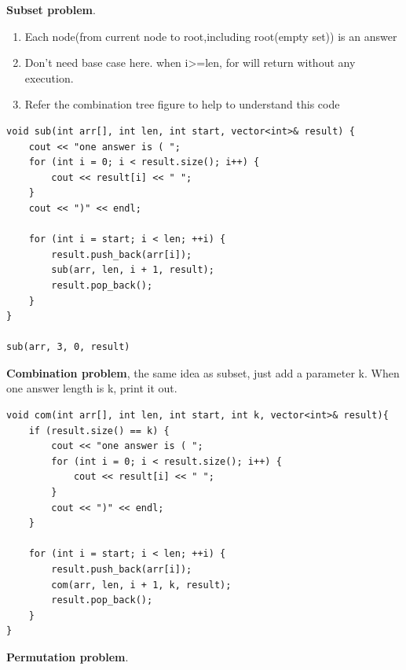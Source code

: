 \documentclass[a4paper,11pt,twoside]{book}
\begin{document}
	\par \textbf{Subset problem}. 
\begin{enumerate}
	\item Each node(from current node to root,including root(empty set)) is an answer
	\item Don't need base case here.  when i>=len, for will return without any execution.
	\item Refer the combination tree figure to help to understand this code
\end{enumerate}
	
\begin{lstlisting}
void sub(int arr[], int len, int start, vector<int>& result) {
	cout << "one answer is ( ";
	for (int i = 0; i < result.size(); i++) {
		cout << result[i] << " ";
	}
	cout << ")" << endl;
	
	for (int i = start; i < len; ++i) {
		result.push_back(arr[i]);  
		sub(arr, len, i + 1, result);
		result.pop_back();
	}
}

sub(arr, 3, 0, result)
\end{lstlisting}
	
	\par \textbf{Combination problem}, the same idea as subset, just add a parameter k. When one answer length is k, print it out. 
	
\begin{lstlisting}
void com(int arr[], int len, int start, int k, vector<int>& result){
	if (result.size() == k) {
		cout << "one answer is ( ";
		for (int i = 0; i < result.size(); i++) {
			cout << result[i] << " ";
		}
		cout << ")" << endl;
	}
	
	for (int i = start; i < len; ++i) {
		result.push_back(arr[i]);  
		com(arr, len, i + 1, k, result);
		result.pop_back();
	}
}	
\end{lstlisting}

	\par \textbf{Permutation problem}. 
	
\end{document}
